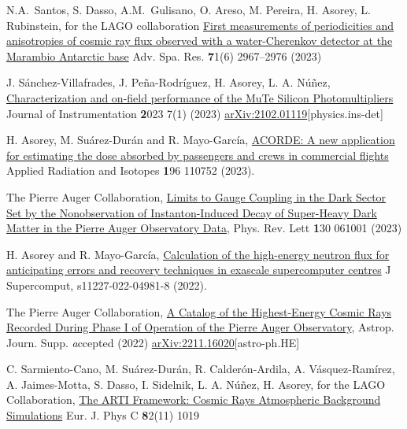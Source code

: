 \begin{etaremune}

\item {} N.A.\ Santos, S. Dasso, A.M.\ Gulisano, O. Areso, M. Pereira, H. Asorey, L. Rubinstein, for the LAGO collaboration \href{https://doi.org/10.1016/j.asr.2022.11.041}{First measurements of periodicities and anisotropies of cosmic ray flux observed with a water-Cherenkov detector at the Marambio Antarctic base} Adv. Spa. Res. {\textbf 71}(6) 2967--2976 (2023)

\item {} J. Sánchez-Villafrades, J. Peña-Rodríguez, H. Asorey, L. A. Núñez, \href{https://doi.org/10.3390/instruments7010007}{Characterization and on-field performance of the MuTe Silicon Photomultipliers} Journal of Instrumentation {\textbf 2023} 7(1) (2023) \href{https://arxiv.org/abs/2102.01119}{arXiv:2102.01119}[physics.ins-det]

\item {} H. Asorey, M. Suárez-Durán and R. Mayo-García, \href{https://doi.org/10.1016/j.apradiso.2023.110752}{ACORDE: A new application for estimating the dose absorbed by passengers and crews in commercial flights} Applied Radiation and Isotopes {\textbf 196} 110752 (2023).

\item {} The Pierre Auger Collaboration, \href{https://doi.org/10.1103/PhysRevLett.130.061001}{Limits to Gauge Coupling in the Dark Sector Set by the Nonobservation of Instanton-Induced Decay of Super-Heavy Dark Matter in the Pierre Auger Observatory Data}, Phys. Rev. Lett {\textbf 130} 061001 (2023)

\item {} H. Asorey and R. Mayo-García, \href{https://doi.org/10.1007/s11227-022-04981-8}{Calculation of the high-energy neutron flux for anticipating errors and recovery techniques in exascale supercomputer centres} J Supercomput, s11227-022-04981-8 (2022).

\item {} The Pierre Auger Collaboration, \href{}{A Catalog of the Highest-Energy Cosmic Rays Recorded During Phase I of Operation of the Pierre Auger Observatory}, Astrop. Journ. Supp. {\textit accepted} (2022) \href{https://arxiv.org/abs/2211.16020}{arXiv:2211.16020}[astro-ph.HE]

\item {} C. Sarmiento-Cano, M. Suárez-Durán, R. Calderón-Ardila, A. Vásquez-Ramírez, A. Jaimes-Motta, S. Dasso, I. Sidelnik, L. A. Núñez, H. Asorey, for the LAGO Collaboration, \href{https://doi.org/10.1140/epjc/s10052-022-10883-z}{The ARTI Framework: Cosmic Rays Atmospheric Background Simulations} Eur. J. Phys C {\textbf 82}(11) 1019


\end{etaremune}
